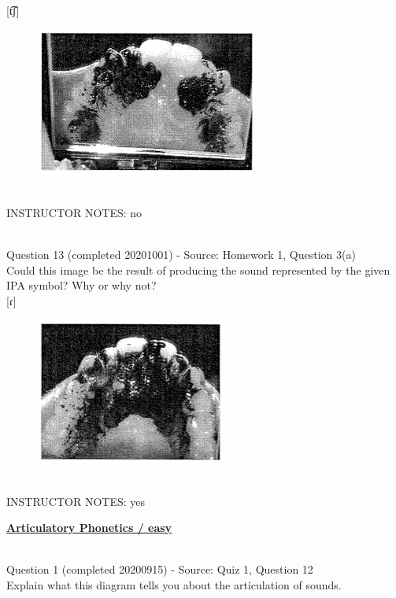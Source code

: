 \documentclass[12pt]{article}
\begin{document}
{[t͡ʃ]}

\begin{figure}[H]
\includegraphics{../images/staticpalatography_fricative.png}
\end{figure}

~\\
INSTRUCTOR NOTES: no


~\\

{\large Question 13} (completed 20201001) - Source: Homework 1, Question 3(a)\\

Could this image be the result of producing the sound represented by the given IPA symbol? Why or why not?\\

{[ɾ]}

\begin{figure}[H]
\includegraphics{../images/staticpalatography_stop.png}
\end{figure}

~\\
INSTRUCTOR NOTES: yes


\newpage\textbf{\underline{\huge Articulatory Phonetics / easy\\}}

~\\

{\large Question 1} (completed 20200915) - Source: Quiz 1, Question 12\\

Explain what this diagram tells you about the articulation of sounds.\\
\end{document}

